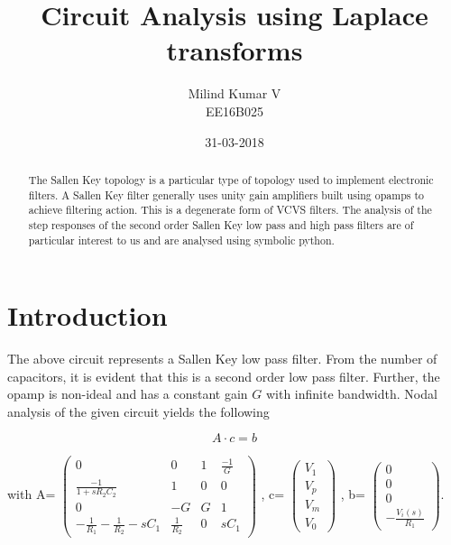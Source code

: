 \documentclass[a4paper, 12pt, margin= 1.25cm]{article}
\title{Circuit Analysis using Laplace transforms}
\date{31-03-2018}
\author{Milind Kumar V\\ EE16B025}
\begin{document}
    
    
    \maketitle
    
    

    
    \begin{abstract}\label{abstract}

The Sallen Key topology is a particular type of topology used to
implement electronic filters. A Sallen Key filter generally uses unity
gain amplifiers built using opamps to achieve filtering action. This is
a degenerate form of VCVS filters. The analysis of the step responses of
the second order Sallen Key low pass and high pass filters are of
particular interest to us and are analysed using symbolic python.

\end{abstract}
\section{Introduction}\label{introduction}

    \begin{center}
    \end{center}

The above circuit represents a Sallen Key low pass filter. From the
number of capacitors, it is evident that this is a second order low pass
filter. Further, the opamp is non-ideal and has a constant gain $G$ with
infinite bandwidth. Nodal analysis of the given circuit yields the
following

\begin{equation}
A\cdot c = b
\end{equation}

with A=
$\left( \begin{matrix} 0 & 0 & 1 & \frac{-1}{G} \\ \frac{-1}{1+sR_2C_2} & 1 & 0 & 0 \\ 0 & -G & G & 1 \\ -\frac{1}{R_1} -\frac{1}{R_2} - sC_1 & \frac{1}{R_2} & 0 & sC_1 \end{matrix} \right)$
, c=
$\left( \begin{matrix} V_1  \\ V_p  \\ V_m  \\ V_0  \end{matrix} \right)$
, b=
$\left( \begin{matrix} 0  \\ 0  \\ 0  \\ -\frac{V_i(s)}{R_1}  \end{matrix} \right)$.
\end{document}
